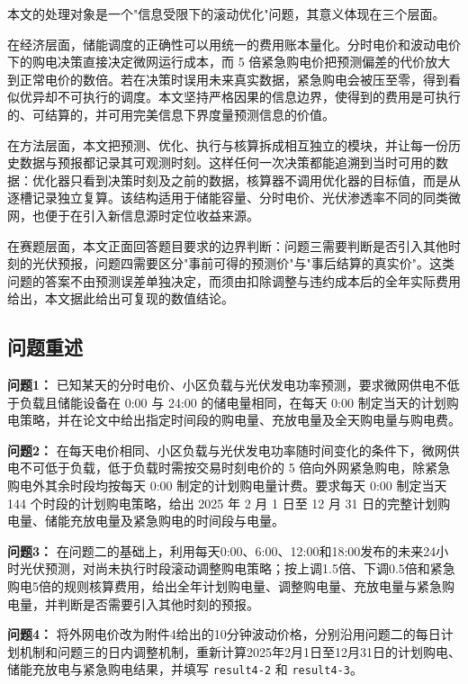 \documentclass[withoutpreface,bwprint]{cumcmthesis}
\begin{document}
本文的处理对象是一个"信息受限下的滚动优化"问题，其意义体现在三个层面。

在经济层面，储能调度的正确性可以用统一的费用账本量化。分时电价和波动电价下的购电决策直接决定微网运行成本，而 5 倍紧急购电价把预测偏差的代价放大到正常电价的数倍。若在决策时误用未来真实数据，紧急购电会被压至零，得到看似优异却不可执行的调度。本文坚持严格因果的信息边界，使得到的费用是可执行的、可结算的，并可用完美信息下界度量预测信息的价值。

在方法层面，本文把预测、优化、执行与核算拆成相互独立的模块，并让每一份历史数据与预报都记录其可观测时刻。这样任何一次决策都能追溯到当时可用的数据：优化器只看到决策时刻及之前的数据，核算器不调用优化器的目标值，而是从逐槽记录独立复算。该结构适用于储能容量、分时电价、光伏渗透率不同的同类微网，也便于在引入新信息源时定位收益来源。

在赛题层面，本文正面回答题目要求的边界判断：问题三需要判断是否引入其他时刻的光伏预报，问题四需要区分"事前可得的预测价"与"事后结算的真实价"。这类问题的答案不由预测误差单独决定，而须由扣除调整与违约成本后的全年实际费用给出，本文据此给出可复现的数值结论。


\subsection{问题重述}

\textbf{问题1：} 已知某天的分时电价、小区负载与光伏发电功率预测，要求微网供电不低于负载且储能设备在 0:00 与 24:00 的储电量相同，在每天 0:00 制定当天的计划购电策略，并在论文中给出指定时间段的购电量、充放电量及全天购电量与购电费。

\textbf{问题2：} 在每天电价相同、小区负载与光伏发电功率随时间变化的条件下，微网供电不可低于负载，低于负载时需按交易时刻电价的 5 倍向外网紧急购电，除紧急购电外其余时段均按每天 0:00 制定的计划购电量计费。要求每天 0:00 制定当天 144 个时段的计划购电策略，给出 2025 年 2 月 1 日至 12 月 31 日的完整计划购电量、储能充放电量及紧急购电的时间段与电量。

\textbf{问题3：} 在问题二的基础上，利用每天0:00、6:00、12:00和18:00发布的未来24小时光伏预测，对尚未执行时段滚动调整购电策略；按上调1.5倍、下调0.5倍和紧急购电5倍的规则核算费用，给出全年计划购电量、调整购电量、充放电量与紧急购电量，并判断是否需要引入其他时刻的预报。

\textbf{问题4：} 将外网电价改为附件4给出的10分钟波动价格，分别沿用问题二的每日计划机制和问题三的日内调整机制，重新计算2025年2月1日至12月31日的计划购电、储能充放电与紧急购电结果，并填写 \texttt{result4-2} 和 \texttt{result4-3}。
\end{document}

